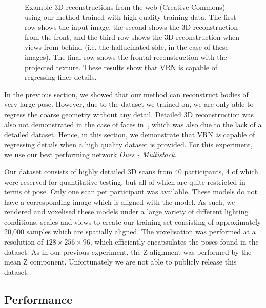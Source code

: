 \begin{figure}
\caption[Visual results when trained on high quality data]{Example 3D
  reconstructions from the web (Creative Commons) using our method
  trained with high quality training data. The first row shows the
  input image, the second shows the 3D reconstruction from the front,
  and the third row shows the 3D reconstruction when views from behind
  (i.e. the hallucinated side, in the case of these images). The final
  row shows the frontal reconstruction with the projected
  texture. These results show that VRN is capable of regressing finer
  details.}
  \label{fig:detailed}
\end{figure}

In the previous section, we showed that our method can reconstruct
bodies of very large pose. However, due to the dataset we trained on,
we are only able to regress the coarse geometry without any
detail. Detailed 3D reconstruction was also not demonstrated in the
case of faces in~\cite{jackson2017vrn}, which was also due to the lack
of a detailed dataset. Hence, in this section, we demonstrate that VRN
\textit{is} capable of regressing details when a high quality dataset
is provided. For this experiment, we use our best performing network
\textit{Ours - Multistack}.

Our dataset consists of highly detailed 3D scans from 40 participants,
4 of which were reserved for quantitative testing, but all of which
are quite restricted in terms of pose. Only one scan per participant
was available. These models do not have a corresponding image which is
aligned with the model. As such, we rendered and voxelised these
models under a large variety of different lighting conditions, scales
and views to create our training set consisting of approximately
20,000 samples which are spatially aligned.  The voxelisation was
performed at a resolution of $128\times 256\times 96$, which
efficiently encapsulates the poses found in the dataset. As in our
previous experiment, the Z alignment was performed by the mean Z
component. Unfortunately we are not able to publicly release this
dataset.

\subsection{Performance}

